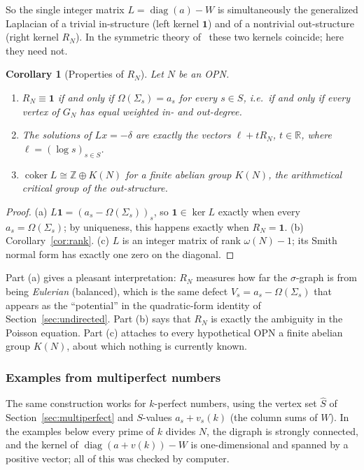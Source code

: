 \documentclass[11pt]{article}
\newtheorem{corollary}[theorem]{Corollary}
\theoremstyle{definition}
\theoremstyle{remark}
\newcommand{\one}{\mathbf{1}}
\begin{document}
So the single integer matrix $L=\operatorname{diag}(a)-W$ is simultaneously
the generalized Laplacian of a trivial in-structure (left kernel $\one$) and
of a nontrivial out-structure (right kernel $R_N$).  In the symmetric theory
of~\cite{MJappl} these two kernels coincide; here they need not.

\begin{corollary}[Properties of $R_N$]\label{cor:RN}
Let $N$ be an OPN.
\begin{enumerate}[label=(\alph*)]
\item $R_N\equiv\one$ if and only if $\Omega(\Sigma_s)=a_s$ for every
  $s\in S$, i.e.\ if and only if every vertex of $G_N$ has equal weighted
  in- and out-degree.
\item The solutions of $Lx=-\delta$ are exactly the vectors
  $\ell+tR_N$, $t\in\mathbb R$, where $\ell=(\log s)_{s\in S}$.
\item $\operatorname{coker}L\cong\mathbb Z\oplus K(N)$ for a finite abelian
  group $K(N)$, the arithmetical critical group of the out-structure.
\end{enumerate}
\end{corollary}

\begin{proof}
(a) $L\one=(a_s-\Omega(\Sigma_s))_s$, so $\one\in\ker L$ exactly when every
$a_s=\Omega(\Sigma_s)$; by uniqueness, this happens exactly when
$R_N=\one$.  (b) Corollary~\ref{cor:rank}.  (c) $L$ is an integer matrix of
rank $\omega(N)-1$; its Smith normal form has exactly one zero on the
diagonal.
\end{proof}

Part (a) gives a pleasant interpretation: $R_N$ measures how far the
$\sigma$-graph is from being \emph{Eulerian} (balanced), which is the same
defect $V_s=a_s-\Omega(\Sigma_s)$ that appears as the ``potential'' in the
quadratic-form identity of Section~\ref{sec:undirected}.  Part (b) says that
$R_N$ is exactly the ambiguity in the Poisson equation.  Part (c) attaches to
every hypothetical OPN a finite abelian group $K(N)$, about which nothing is
currently known.

\subsubsection{Examples from multiperfect numbers}

The same construction works for $k$-perfect numbers, using the vertex set
$\widehat S$ of Section~\ref{sec:multiperfect} and $S$-values
$a_s+v_s(k)$ (the column sums of $W$).  In the examples below every prime
of $k$ divides $N$, the digraph is strongly connected, and the kernel of
$\operatorname{diag}(a+v(k))-W$ is one-dimensional and spanned by a positive
vector; all of this was checked by computer.
\end{document}
